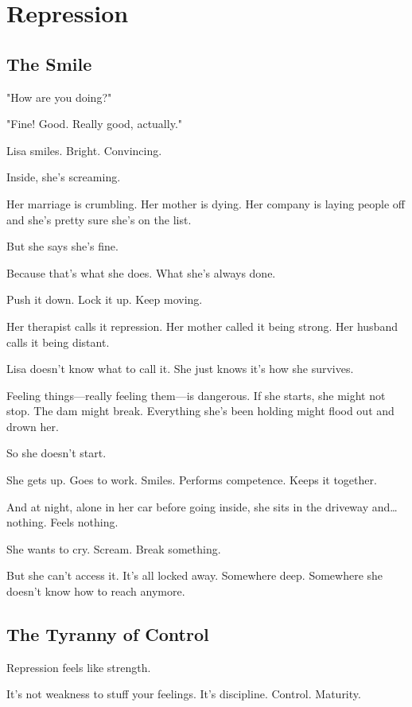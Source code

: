 \documentclass[11pt,twoside]{book}
\begin{document}
\chapter{Repression}

\section*{The Smile}

"How are you doing?"

"Fine! Good. Really good, actually."

Lisa smiles. Bright. Convincing.

Inside, she's screaming.

Her marriage is crumbling. Her mother is dying. Her company is laying people off and she's pretty sure she's on the list.

But she says she's fine.

Because that's what she does. What she's always done.

Push it down. Lock it up. Keep moving.

Her therapist calls it repression. Her mother called it being strong. Her husband calls it being distant.

Lisa doesn't know what to call it. She just knows it's how she survives.

Feeling things—really feeling them—is dangerous. If she starts, she might not stop. The dam might break. Everything she's been holding might flood out and drown her.

So she doesn't start.

She gets up. Goes to work. Smiles. Performs competence. Keeps it together.

And at night, alone in her car before going inside, she sits in the driveway and\ldots{} nothing. Feels nothing.

She wants to cry. Scream. Break something.

But she can't access it. It's all locked away. Somewhere deep. Somewhere she doesn't know how to reach anymore.

\section*{The Tyranny of Control}

Repression feels like strength.

It's not weakness to stuff your feelings. It's discipline. Control. Maturity.
\end{document}
